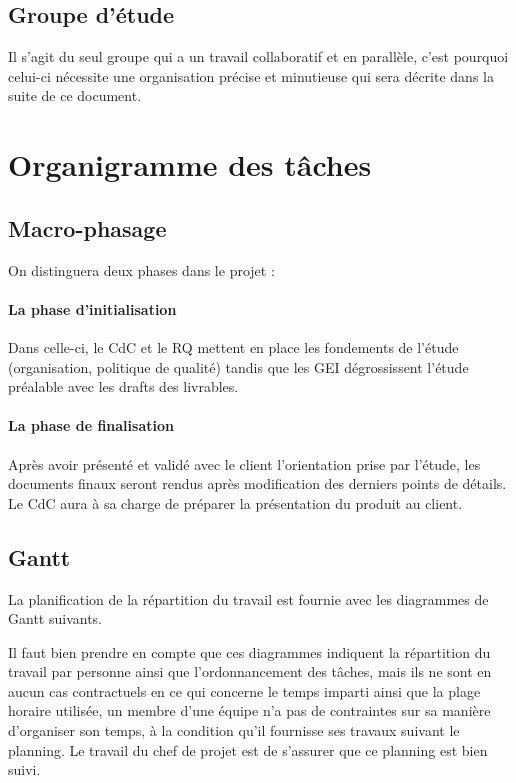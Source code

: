 \documentclass[a4paper, 11pt, draft]{report}
\begin{document}
    \subsection{Groupe d'étude}

    Il s'agit du seul groupe qui a un travail collaboratif et en parallèle, c'est pourquoi celui-ci nécessite une organisation précise et minutieuse qui sera décrite dans la suite de ce document.


\section{Organigramme des tâches}
    \subsection{Macro-phasage}
        On distinguera deux phases dans le projet :
        \paragraph{La phase d'initialisation} Dans celle-ci, le CdC et le RQ mettent en place les fondements de l'étude (organisation, politique de qualité) tandis que les GEI dégrossissent l'étude préalable avec les drafts des livrables.
        \paragraph{La phase de finalisation} Après avoir présenté et validé avec le client l'orientation prise par l'étude, les documents finaux seront rendus après modification des derniers points de détails. Le CdC aura à sa charge de préparer la présentation du produit au client.
    \subsection{Gantt}
    La planification de la répartition du travail est fournie avec les diagrammes de Gantt suivants.

    Il faut bien prendre en compte que ces diagrammes indiquent la répartition du travail par personne ainsi que l'ordonnancement des tâches, mais ils ne sont en aucun cas contractuels en ce qui concerne le temps imparti ainsi que la plage horaire utilisée, un membre d'une équipe n'a pas de contraintes sur sa manière d'organiser son temps, à la condition qu'il fournisse ses travaux suivant le planning.
    Le travail du chef de projet est de s'assurer que ce planning est bien suivi.
\end{document}
